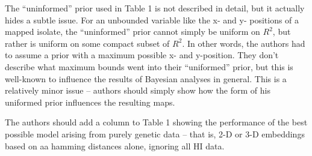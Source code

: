\documentclass[11pt,oneside,letterpaper]{article}
\begin{document}
The ``uninformed'' prior used in Table 1 is not described in detail, but it actually hides a subtle issue. For an unbounded variable like the x- and y- positions of a mapped isolate, the ``uninformed'' prior cannot simply be uniform on $R^2$, but rather is uniform on some compact subset of $R^2$. In other words, the authors had to assume a prior with a maximum possible x- and y-position. They don't describe what maximum bounds went into their ``uniformed'' prior, but this is well-known to influence the results of Bayesian analyses in general. This is a relatively minor issue -- authors should simply show how the form of his uniformed prior influences the resulting maps.

The authors should add a column to Table 1 showing the performance of the best possible model arising from purely genetic data -- that is, 2-D or 3-D embeddings based on aa hamming distances alone, ignoring all HI data.



\end{document}
